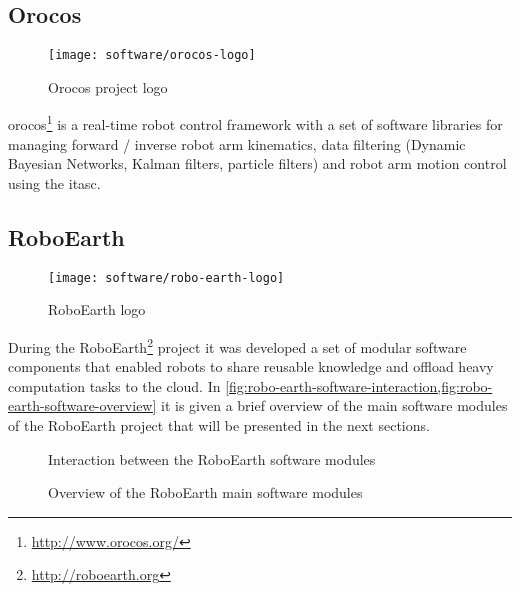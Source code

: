 \subsection{Orocos}

\begin{wrapfigure}{r}{0.23\textwidth}
	\centering
	\vspace*{-2em}
	\texttt{[image: software/orocos-logo]}
	\caption{Orocos project logo}
	\label{fig:orocos-logo}
\end{wrapfigure}

\gls{orocos}\footnote{\url{http://www.orocos.org/}} is a real-time robot control framework with a set of software libraries for managing forward / inverse robot arm kinematics, data filtering (Dynamic Bayesian Networks, Kalman filters, particle filters) and robot arm motion control using the \gls{itasc}.




\subsection{RoboEarth}

\begin{wrapfigure}{r}{0.23\textwidth}
	\centering
	\vspace*{-2em}
	\texttt{[image: software/robo-earth-logo]}
	\caption{RoboEarth logo}
	\label{fig:robo-earth-logo}
\end{wrapfigure}

During the RoboEarth\footnote{\url{http://roboearth.org}} project it was developed a set of modular software components that enabled robots to share reusable knowledge and offload heavy computation tasks to the cloud. In \cref{fig:robo-earth-software-interaction,fig:robo-earth-software-overview} it is given a brief overview of the main software modules of the RoboEarth project that will be presented in the next sections.


\begin{figure}[H]
	\begin{floatrow}[2]
		{\caption[Interaction between the RoboEarth software modules]{Interaction between the RoboEarth software modules \cite{DiMarco2013}}\label{fig:robo-earth-software-interaction}}

		{\caption[Overview of the RoboEarth main software modules]{Overview of the RoboEarth main software modules\protect\footnotemark}\label{fig:robo-earth-software-overview}}
	\end{floatrow}
\end{figure}




